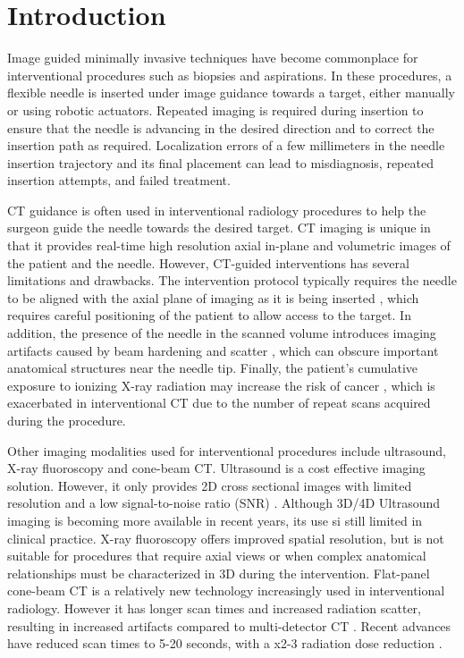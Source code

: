 \section{Introduction}

Image guided minimally invasive techniques have become commonplace for interventional procedures such as biopsies and aspirations.
In these procedures, a flexible needle is inserted under image guidance towards a target, either manually or using robotic actuators. Repeated imaging is required during insertion to ensure that the needle is advancing in the desired direction and to correct the insertion path as required. Localization errors of a few millimeters in the needle insertion trajectory and its final placement can lead to misdiagnosis, repeated insertion attempts, and failed treatment.

CT guidance is often used in interventional radiology procedures to help the surgeon guide the needle towards the desired target. CT imaging is unique in that it provides real-time high resolution axial in-plane and volumetric images of the patient and the needle. However,
CT-guided interventions has several limitations and drawbacks.
The intervention protocol typically requires the needle to be aligned with the axial plane of imaging as it is being inserted \cite{gupta2014ct}, which requires careful positioning of the patient to allow access to the target. In addition, the presence of the needle in the scanned volume introduces imaging artifacts caused by beam hardening and scatter \cite{boas2012ctartifacts}, which can obscure important anatomical structures near the needle tip. Finally, the patient's cumulative exposure to ionizing X-ray radiation may increase the risk of cancer \cite{mettler2000ct, chodick2007excess}, which is exacerbated in interventional CT due to the number of repeat scans acquired during the procedure.

Other imaging modalities used for interventional procedures include ultrasound, X-ray fluoroscopy and cone-beam CT.
Ultrasound is a cost effective imaging solution. However, it only provides 2D cross sectional images with limited resolution and a low signal-to-noise ratio (SNR) \cite{sheafor2000comparison}. Although 3D/4D Ultrasound imaging is becoming more available in recent years, 
its use si still limited in clinical practice.
X-ray fluoroscopy offers improved spatial resolution, but is not suitable for procedures that require axial views or when complex anatomical relationships must be characterized in 3D during the intervention.
Flat-panel cone-beam CT is a relatively new technology increasingly used in interventional radiology. However it has longer scan times and increased radiation scatter, resulting in increased artifacts compared to multi-detector CT \cite{orth2008cbct}. Recent advances have reduced scan times to 5-20 seconds, with a x2-3 radiation dose reduction \cite{dynact}.

